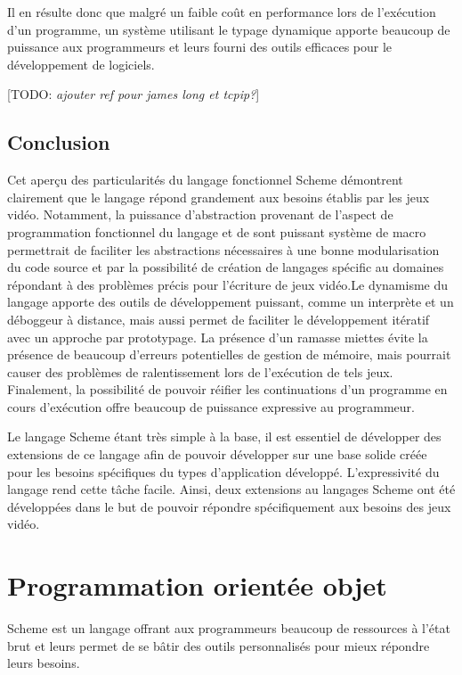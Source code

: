 \documentclass[12pt,oneside,letterpaper,francais]{book}
\newcommand{\todo}[1]{[TODO: {\it #1}]}
\begin{document}
Il en résulte donc que malgré un faible coût en performance lors de
l'exécution d'un programme, un système utilisant le typage dynamique
apporte beaucoup de puissance aux programmeurs et leurs fourni des
outils efficaces pour le développement de logiciels.

\todo{ajouter ref pour james long et tcpip?}


\section{Conclusion}

Cet aperçu des particularités du langage fonctionnel Scheme démontrent
clairement que le langage répond grandement aux besoins établis par
les jeux vidéo. Notamment, la puissance d'abstraction provenant de
l'aspect de programmation fonctionnel du langage et de sont puissant
système de macro permettrait de faciliter les abstractions nécessaires
à une bonne modularisation du code source et par la possibilité de
création de langages spécific au domaines répondant à des problèmes
précis pour l'écriture de jeux vidéo.Le dynamisme du langage apporte
des outils de développement puissant, comme un interprète et un
déboggeur à distance, mais aussi permet de faciliter le développement
itératif avec un approche par prototypage. La présence d'un ramasse
miettes évite la présence de beaucoup d'erreurs potentielles de
gestion de mémoire, mais pourrait causer des problèmes de
ralentissement lors de l'exécution de tels jeux. Finalement, la
possibilité de pouvoir réifier les continuations d'un programme en
cours d'exécution offre beaucoup de puissance expressive au
programmeur.

Le langage Scheme étant très simple à la base, il est essentiel de
développer des extensions de ce langage afin de pouvoir développer sur
une base solide créée pour les besoins spécifiques du types
d'application développé. L'expressivité du langage rend cette tâche
facile. Ainsi, deux extensions au langages Scheme ont été développées
dans le but de pouvoir répondre spécifiquement aux besoins des jeux
vidéo.


\chapter{Programmation orientée objet}
\label{Chap:OO}

Scheme est un langage offrant aux programmeurs beaucoup de ressources
à l'état brut et leurs permet de se bâtir des outils personnalisés
pour mieux répondre leurs besoins.
\end{document}
